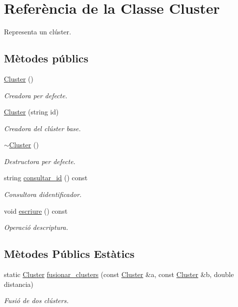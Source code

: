 \hypertarget{class_cluster}{}\section{Referència de la Classe Cluster}
\label{class_cluster}


Representa un clúster.  


\subsection*{Mètodes públics}
\begin{DoxyCompactItemize}
\item 
\hyperlink{class_cluster_aee7feb1d599d4c8fda6c3ee83e86ba81}{Cluster} ()
\begin{DoxyCompactList}\small\item\em Creadora per defecte. \end{DoxyCompactList}\item 
\hyperlink{class_cluster_abd445aca5dbd737d7366bfa8fa1b44ea}{Cluster} (string id)
\begin{DoxyCompactList}\small\item\em Creadora del clúster base. \end{DoxyCompactList}\item 
\hyperlink{class_cluster_a4bddfc88ac859610acab15dd12851b58}{$\sim$\+Cluster} ()
\begin{DoxyCompactList}\small\item\em Destructora per defecte. \end{DoxyCompactList}\item 
string \hyperlink{class_cluster_a040da4a393c7fcb8ac7edbe5b82679cf}{consultar\+\_\+id} () const
\begin{DoxyCompactList}\small\item\em Consultora d\textquotesingle{}identificador. \end{DoxyCompactList}\item 
void \hyperlink{class_cluster_aae67c144fc543eace946dc8a651b5b7a}{escriure} () const
\begin{DoxyCompactList}\small\item\em Operació d\textquotesingle{}escriptura. \end{DoxyCompactList}\end{DoxyCompactItemize}
\subsection*{Mètodes Públics Estàtics}
\begin{DoxyCompactItemize}
\item 
static \hyperlink{class_cluster}{Cluster} \hyperlink{class_cluster_a3b6ef4bede0ac20ae591db48c8976729}{fusionar\+\_\+clusters} (const \hyperlink{class_cluster}{Cluster} \&a, const \hyperlink{class_cluster}{Cluster} \&b, double distancia)
\begin{DoxyCompactList}\small\item\em Fusió de dos clústers. \end{DoxyCompactList}\end{DoxyCompactItemize}
